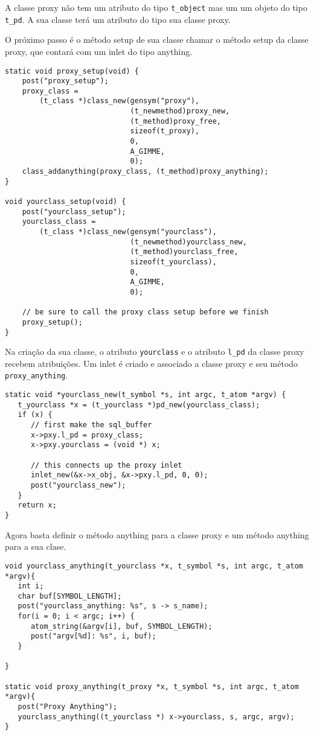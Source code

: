 A classe proxy não tem um atributo do tipo \texttt{t\_object} mas um um objeto do tipo
\texttt{t\_pd}.
A sua classe terá um atributo do tipo sua classe proxy.

O próximo passo é o método setup de sua classe chamar o método setup da classe
proxy, que contará com um inlet do tipo anything.

\begin{lstlisting}[caption=configuração de um inlet proxy]
static void proxy_setup(void) {
	post("proxy_setup");
	proxy_class =
		(t_class *)class_new(gensym("proxy"),
							 (t_newmethod)proxy_new,
							 (t_method)proxy_free,
							 sizeof(t_proxy),
							 0,
							 A_GIMME,
							 0);
	class_addanything(proxy_class, (t_method)proxy_anything);
}

void yourclass_setup(void) {
	post("yourclass_setup");
	yourclass_class =
		(t_class *)class_new(gensym("yourclass"),
							 (t_newmethod)yourclass_new,
							 (t_method)yourclass_free,
							 sizeof(t_yourclass),
							 0,
							 A_GIMME,
							 0);
	
	// be sure to call the proxy class setup before we finish
	proxy_setup();
}
\end{lstlisting}

Na criação da sua classe, o atributo \texttt{yourclass} e o atributo \texttt{l\_pd} da
classe proxy recebem atribuições.
Um inlet é criado e associado a classe proxy e seu método \texttt{proxy\_anything}.

\begin{lstlisting}[caption=Criação da classe com um inlet proxy]
static void *yourclass_new(t_symbol *s, int argc, t_atom *argv) {
   t_yourclass *x = (t_yourclass *)pd_new(yourclass_class);
   if (x) {
      // first make the sql_buffer
      x->pxy.l_pd = proxy_class;
      x->pxy.yourclass = (void *) x;
      
      // this connects up the proxy inlet
      inlet_new(&x->x_obj, &x->pxy.l_pd, 0, 0);
      post("yourclass_new");
   }
   return x;
}
\end{lstlisting}

Agora basta definir o método anything para a classe proxy e um método anything
para a sua clase.

\begin{lstlisting}[caption=Passagem de dados da classe proxy para a classe principal]
void yourclass_anything(t_yourclass *x, t_symbol *s, int argc, t_atom *argv){
   int i;
   char buf[SYMBOL_LENGTH];
   post("yourclass_anything: %s", s -> s_name);
   for(i = 0; i < argc; i++) {
      atom_string(&argv[i], buf, SYMBOL_LENGTH);
      post("argv[%d]: %s", i, buf);
   }

}

static void proxy_anything(t_proxy *x, t_symbol *s, int argc, t_atom *argv){
   post("Proxy Anything");
   yourclass_anything((t_yourclass *) x->yourclass, s, argc, argv);
}
\end{lstlisting}

